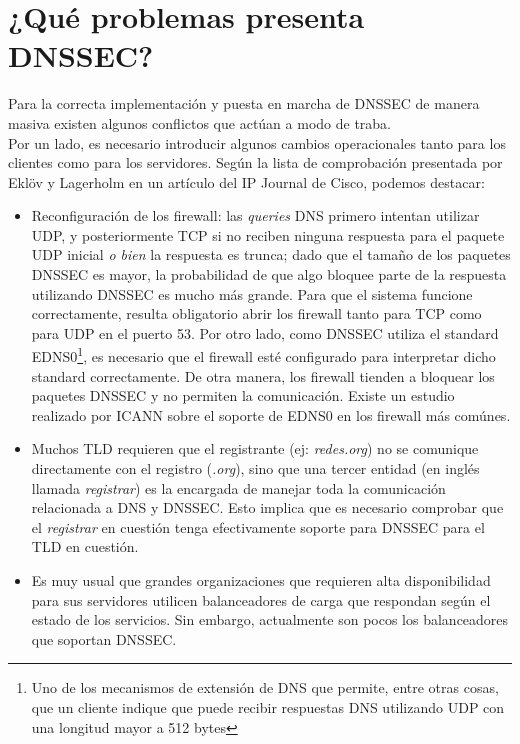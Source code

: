\chapter{¿Qu\'e problemas presenta DNSSEC?}
Para la correcta implementaci\'on y puesta en marcha de DNSSEC de manera masiva existen algunos conflictos que act\'uan a modo de traba.\\
Por un lado, es necesario introducir algunos cambios operacionales tanto para los clientes como para los servidores. Seg\'un la lista de comprobaci\'on presentada por Ekl\"{o}v y Lagerholm en un art\'iculo del IP Journal de Cisco\cite{imp2011}, podemos destacar:
\begin{itemize}
 \item Reconfiguraci\'on de los firewall: las \textit{queries} DNS primero intentan utilizar UDP, y posteriormente TCP si no reciben ninguna respuesta para el paquete UDP inicial \textit{o bien} la respuesta es trunca; dado que el tama\~no de los paquetes DNSSEC es mayor, la probabilidad de que algo bloquee parte de la respuesta utilizando DNSSEC es mucho m\'as grande. Para que el sistema funcione correctamente, resulta obligatorio abrir los firewall tanto para TCP como para UDP en el puerto 53. Por otro lado, como DNSSEC utiliza el standard EDNS0\footnote{Uno de los mecanismos de extensi\'on de DNS que permite, entre otras cosas, que un cliente indique que puede recibir respuestas DNS utilizando UDP con una longitud mayor a 512 bytes}, es necesario que el firewall est\'e configurado para interpretar dicho standard correctamente. De otra manera, los firewall tienden a bloquear los paquetes DNSSEC y no permiten la comunicaci\'on. Existe un estudio realizado por ICANN sobre el soporte de EDNS0 en los firewall m\'as com\'unes\cite{icann07}.
 \item Muchos TLD requieren que el registrante (ej: \textit{redes.org}) no se comunique directamente con el registro (\textit{.org}), sino que una tercer entidad (en ingl\'es llamada \textit{registrar}) es la encargada de manejar toda la comunicaci\'on relacionada a DNS y DNSSEC. Esto implica que es necesario comprobar que el \textit{registrar} en cuesti\'on tenga efectivamente soporte para DNSSEC para el TLD en cuesti\'on.
 \item Es muy usual que grandes organizaciones que requieren alta disponibilidad para sus servidores utilicen balanceadores de carga que respondan seg\'un el estado de los servicios. Sin embargo, actualmente son pocos los balanceadores que soportan DNSSEC.
\end{itemize}

